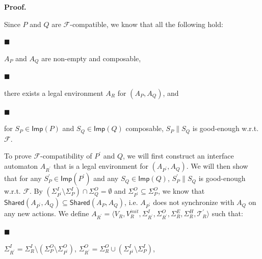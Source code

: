 \par\medskip\noindent\textbf{Proof.}\par
 
 
Since $P$ and $Q$ are $\mathcal{F}$-compatible, we know that all the following hold:\par
  
\par\noindent  $\blacksquare$ 
 
$A_{P}$ and $A_{Q}$ are non-empty and composable,\par
 
 
 
\par\noindent  $\blacksquare$ 
 
there exists a legal environment $A_{R}$ for $(A_{P},A_{Q})$, and\par
 
 
 
\par\noindent  $\blacksquare$ 
 
for $S_{P}\in\mathsf{Imp}(P)$ and $S_{Q}\in\mathsf{Imp}(Q)$ composable, $S_{P}\parallel S_{Q}$ is good-enough w.r.t. $\mathcal{F}$.\par
 
 
  
To prove $\mathcal{F}$-compatibility of $P^{\prime}$ and $Q$, we will first construct an interface automaton $A_{R^{\prime}}$ that is a legal environment for $(A_{P^{\prime}},A_{Q})$. We will then show that for any $S_{P}^{\prime}\in\mathsf{Imp}(P^{\prime})$ and any $S_{Q}\in\mathsf{Imp}(Q)$, $S_{P}^{\prime}\parallel S_{Q}$ is good-enough w.r.t. $\mathcal{F}$. By $(\Sigma_{P^{\prime}}^{I}\setminus\Sigma_{P}^{I})\cap\Sigma_{Q}^{O}=\emptyset$ and $\Sigma_{P^{\prime}}^{O}\subseteq\Sigma_{P}^{O}$, we know that $\mathsf{Shared}(A_{P^{\prime}},A_{Q})\subseteq\mathsf{Shared}(A_{P},A_{Q})$, i.e. $A_{P^{\prime}}$ does not synchronize with $A_{Q}$ on any new actions. We define $A_{R^{\prime}}=\langle V_{R},V_{R}^{init},\Sigma_{R^{\prime}}^{I},\Sigma_{R^{\prime}}^{O},\Sigma_{R}^{E},\Sigma_{R}^{H},\mathcal{T}^{\prime}_{R}\rangle$ such that:\par
  
\par\noindent  $\blacksquare$ 
 
$\Sigma_{R^{\prime}}^{I}=\Sigma_{R}^{I}\setminus(\Sigma_{P}^{O}\setminus\Sigma_{P^{\prime}}^{O})$, $\Sigma_{R^{\prime}}^{O}=\Sigma_{R}^{O}\cup(\Sigma_{P^{\prime}}^{I}\setminus\Sigma_{P}^{I})$,\par
 

